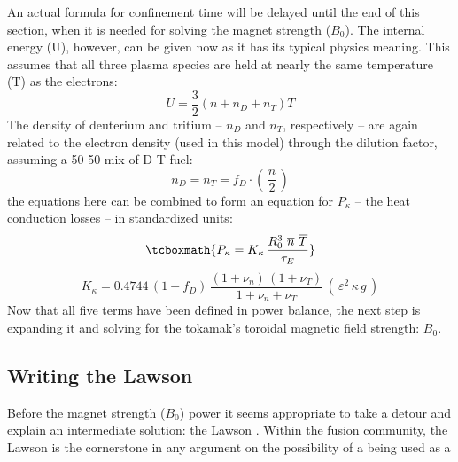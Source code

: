 An actual formula for confinement time will be delayed until the end of this section, when it is needed for solving the magnet strength ($B_0$). The internal energy (U), however, can be given now as it has its typical physics meaning. This assumes that all three plasma species are held at nearly the same temperature (T) as the electrons:
\begin{equation}
	U = \frac{3}{2} \left( n + n_D + n_T \right) T
\end{equation}
The density of deuterium and tritium -- $n_D$ and $n_T$, respectively -- are again related to the electron density (used in this model) through the dilution factor, assuming a 50-50 mix of D-T fuel:
\begin{equation}
	n_D = n_T = f_D \cdot \left( \, \frac{n}{2} \, \right)
\end{equation}
 the equations here can be combined to form an equation for $P_\kappa$ -- the heat conduction losses -- in standardized units:
\begin{equation}
	\label{eq:pkappa}
	\tcboxmath{
	P_\kappa = K_\kappa \, \frac{ R_0 ^ 3 \ \overline{n}  \ \overline{T}  }{\tau_E}
	}
\end{equation}
\begin{equation}
	K_\kappa = 0.4744 \, ( 1 + f_D ) \, \frac{ (1 + \nu_n) \, (1 + \nu_T) }{1 + \nu_n + \nu_T } \, ( \, \varepsilon^2 \, \kappa \, g \, )
\end{equation}
Now that all five terms have been defined in power balance, the next step is expanding it and solving for the tokamak's toroidal magnetic field strength: $B_0$.

\subsection{Writing the Lawson }

Before  the magnet strength ($B_0$)  power  it seems appropriate to take a detour and explain an intermediate solution: the Lawson .\cite{lawson} Within the fusion community, the Lawson  is the cornerstone in any argument on the possibility of a  being used as a 


